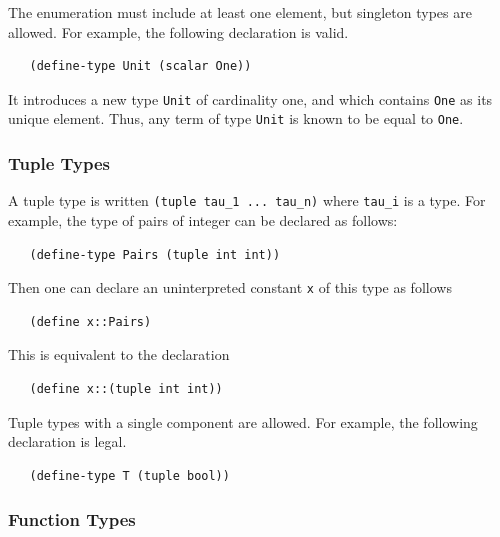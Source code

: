 \documentclass[11pt,twoside,fleqn,openright,titlepage]{cslreport}
\begin{document}
\medskip\noindent The enumeration must include at least one element,
but  singleton   types  are   allowed.  For  example,   the  following
declaration is valid.
\begin{small}
\begin{verbatim}
   (define-type Unit (scalar One))
\end{verbatim}
\end{small}
It introduces a  new type \texttt{Unit} of cardinality  one, and which
contains \texttt{One}  as its unique  element. Thus, any term  of type
\texttt{Unit} is known to be equal to \texttt{One}.


\subsubsection*{Tuple Types}

A tuple  type is written \texttt{(tuple tau\_1  ... tau\_n)} where
\texttt{tau\_i} is a type. For example, the type of pairs of integer
can be declared as follows:
\begin{small}
\begin{verbatim}
   (define-type Pairs (tuple int int))
\end{verbatim}
\end{small}
Then one can declare an uninterpreted constant \texttt{x} of this type
as follows
\begin{small}
\begin{verbatim}
   (define x::Pairs)
\end{verbatim}
\end{small}
This is equivalent to the declaration
\begin{small}
\begin{verbatim}
   (define x::(tuple int int))
\end{verbatim}
\end{small}

\medskip\noindent   Tuple  types   with  a   single   component  are
allowed. For example, the following declaration is legal.
\begin{small}
\begin{verbatim}
   (define-type T (tuple bool))
\end{verbatim}
\end{small}

\subsubsection*{Function Types}
\end{document}
